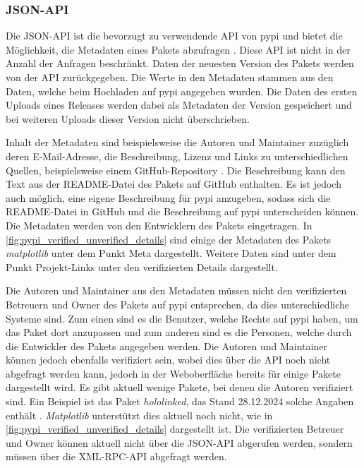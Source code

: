 \subsubsection*{JSON-API}
\label{subsubsec:pypi_json_api}
Die JSON-API ist die bevorzugt zu verwendende API von \gls{pypi} und bietet die Möglichkeit, die Metadaten eines Pakets abzufragen \autocite{python_software_foundation_warehouse_2024}.
Diese API ist nicht in der Anzahl der Anfragen beschränkt.
Daten der neuesten Version des Pakets werden von der API zurückgegeben.
Die Werte in den Metadaten stammen aus den Daten, welche beim Hochladen auf \gls{pypi} angegeben wurden.
Die Daten des ersten Uploads eines Releases werden dabei als Metadaten der Version gespeichert und bei weiteren Uploads dieser Version nicht überschrieben.

Inhalt der Metadaten sind beispielsweise die Autoren und Maintainer zuzüglich deren E-Mail-Adresse, die Beschreibung, Lizenz und Links zu unterschiedlichen Quellen, beispielsweise einem GitHub-Repository \autocite{python_software_foundation_warehouse_2024}.
Die Beschreibung kann den Text aus der README-Datei des Pakets auf GitHub enthalten.
Es ist jedoch auch möglich, eine eigene Beschreibung für \gls{pypi} anzugeben, sodass sich die README-Datei in GitHub und die Beschreibung auf \gls{pypi} unterscheiden können.
Die Metadaten werden von den Entwicklern des Pakets eingetragen.
In \autoref{fig:pypi_verified_unverified_details} sind einige der Metadaten des Pakets \emph{matplotlib} unter dem Punkt \glqq Meta\grqq{} dargestellt.
Weitere Daten sind unter dem Punkt \glqq Projekt-Links\grqq{} unter den verifizierten Details dargestellt.

Die Autoren und Maintainer aus den Metadaten müssen nicht den verifizierten Betreuern und Owner des Pakets auf \gls{pypi} entsprechen, da dies unterschiedliche Systeme sind.
Zum einen sind es die Benutzer, welche Rechte auf \gls{pypi} haben, um das Paket dort anzupassen und zum anderen sind es die Personen, welche durch die Entwickler des Pakets angegeben werden.
Die Autoren und Maintainer können jedoch ebenfalls verifiziert sein, wobei dies über die API noch nicht abgefragt werden kann, jedoch in der Weboberfläche bereits für einige Pakete dargestellt wird.
Es gibt aktuell wenige Pakete, bei denen die Autoren verifiziert sind.
Ein Beispiel ist das Paket \emph{hololinked}, das Stand 28.12.2024 solche Angaben enthält \autocite{venkatasubramanian_vaidyanathan_hololinked_2024}.
\emph{Matplotlib} unterstützt dies aktuell noch nicht, wie in \autoref{fig:pypi_verified_unverified_details} dargestellt ist.
Die verifizierten Betreuer und Owner können aktuell nicht über die JSON-API abgerufen werden, sondern müssen über die XML-RPC-API abgefragt werden.

